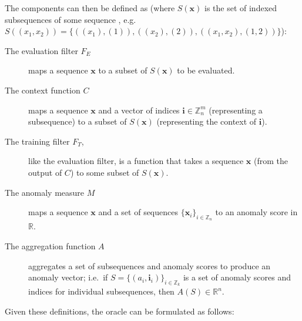 The components can then be defined as (where $S(\mathbf{x})$ is the set of indexed subsequences of some sequence , e.g. $S((x_1, x_2)) = \{((x_1), (1)), ((x_2), (2)), ((x_1, x_2), (1, 2))\}$):
\begin{description}
    \item[The evaluation filter $F_E$]maps a sequence $\mathbf{x}$ to a subset of $S(\mathbf{x})$ to be evaluated.
    \item[The context function $C$]maps a sequence $\mathbf{x}$ and a vector of indices $\mathbf{i} \in \mathbb{Z}_n^m$ (representing a subsequence) to a subset of $S(\mathbf{x})$ (representing the context of $\mathbf{i}$).
    \item[The training filter $F_T$,]like the evaluation filter, is a function that takes a sequence $\mathbf{x}$ (from the output of $C$) to some subset of $S(\mathbf{x})$.
    \item[The anomaly measure $M$]maps a sequence $\mathbf{x}$ and a set of sequences ${\{\mathbf{x}_i\}}_{i \in \mathbb{Z}_n}$ to an anomaly score in $\mathbb{R}$.
    \item[The aggregation function $A$]aggregates a set of subsequences and anomaly scores to produce an anomaly vector; i.e.\  if $S = {\{(a_i, \mathbf{i}_i)\}}_{i \in \mathbb{Z}_k}$ is a set of anomaly scores and indices for individual subsequences, then $A(S) \in \mathbb{R}^{n}$.
\end{description}

Given these definitions, the oracle can be formulated as follows:
\begin{algorithmic}
     
    \EndFor{}
\end{algorithmic}


